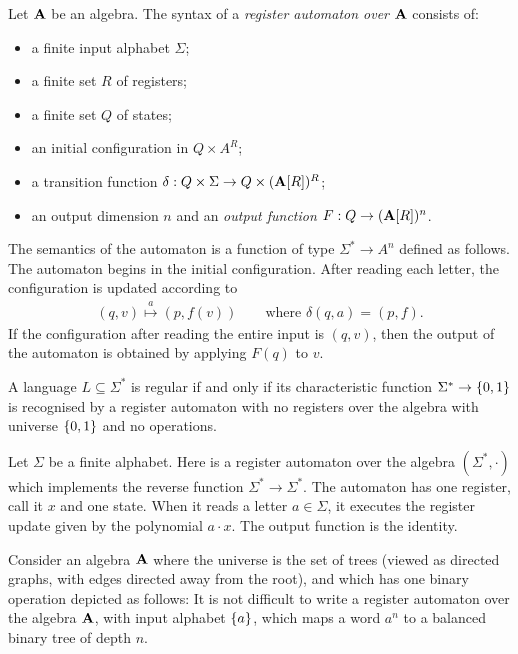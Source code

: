\begin{definition}\label{def:hilbert-register-automaton} Let $\mathbf A$ be an algebra.
	The syntax of a \emph{register automaton over $\mathbf A$} consists of:
	\begin{itemize}
		\item a finite input alphabet $\Sigma$;
		\item a finite set $R$ of registers;
		\item a finite set $Q$ of states;
		\item an initial configuration in $Q \times A^R$;
		\item a transition function $  \delta : Q \times \Sigma \to Q \times  (\mathbf A[R])^R$;
\item an output dimension $n$ and an \emph{output function} $F : Q \to (\mathbf A[R])^n$.
	\end{itemize}
	The semantics of the automaton is a function of type $\Sigma^* \to A^n$  defined as follows. The automaton begins in the initial configuration. After reading each letter, the configuration is updated according to
	\begin{align*}
  (q,v) \stackrel a \mapsto (p,f(v)) \qquad \mbox{where }\delta(q,a) = (p,f).
\end{align*}
If the configuration after reading the entire input is $(q,v)$, then the output of the automaton is obtained by applying $F(q)$ to $v$.
\end{definition}

\begin{example}
	A language $L \subseteq \Sigma^*$ is regular if and only if its characteristic function $\Sigma^* \to \{0,1\}$ is recognised by a register automaton with no registers over the algebra with universe $\{0,1\}$ and no operations.
\end{example}

\begin{example}
Let $\Sigma$ be a finite alphabet. Here is a register automaton over the algebra $(\Sigma^*,\cdot)$ which implements the reverse function $\Sigma^* \to \Sigma^*$. The automaton has one register, call it $x$ and one state. When it reads a letter $a \in \Sigma$, it executes the register update given by the polynomial $a \cdot x$. The output function is the identity. 
\end{example}

\begin{example}\label{ex:register-automaton-on-strings}
	Consider an algebra $\mathbf A$ where the universe is the set of trees (viewed as directed graphs, with edges directed away from the root), and which has one binary operation 
	depicted as follows:
	It is not difficult to write a register automaton over the algebra $\mathbf A$, with input alphabet $\{a\}$, which maps a word $a^n$ to a balanced binary tree of depth $n$.
\end{example}

